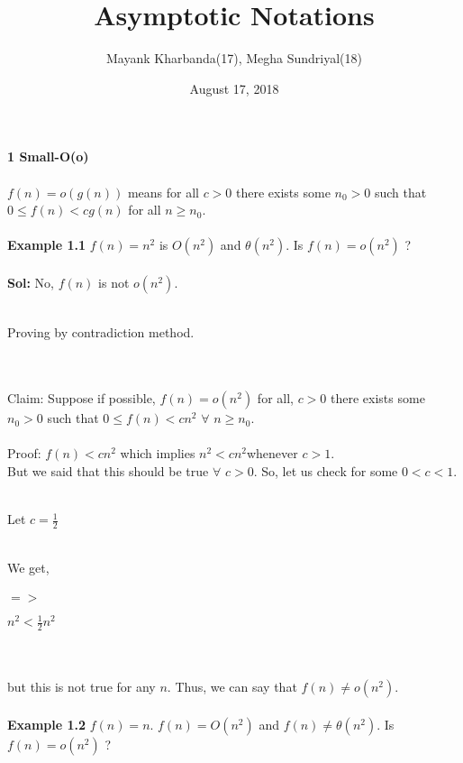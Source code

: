 \documentclass[a4paper, 12pt]{article}
\begin{document}
	\title{Asymptotic Notations}
	\author{Mayank Kharbanda(17), Megha Sundriyal(18)}
	\date{August 17, 2018}

	\maketitle
\paragraph{}
	\textbf{1 Small-O(o)}
\paragraph{}
	$f(n) = o(g(n))$ means for all $c > 0$ there exists some $n_{0} > 0$ such that $0\leq f(n)<cg(n)$ for all $n \geq n_{0}$.
\paragraph{}
	\textbf{Example 1.1} $f(n) = n^{2}$ is $O(n^{2})$ and $\theta(n^{2})$. Is $f(n) =  o(n^{2})$ ?
\paragraph{}
    \textbf{Sol:} No, $f(n)$ is not $o(n^{2})$.
	\\ \\ \centerline{Proving by contradiction method.}
	\\ \\Claim: Suppose if possible, $f(n) = o(n^{2})$ for all, $c > 0 $ there exists some $n_{0} > 0$ such that $0\leq f(n) < cn^{2}$ $\forall$ $n \geq n_{0}$.
	\\ \\Proof:
    	$f(n) <cn^{2}$ which implies $n^{2} < cn^{2}$whenever $c > 1$.
	\\But we said that this should be true $\forall$ $c > 0$. So, let us check for some $0 < c < 1$. 
	\\ \\ \centerline{Let $c = \frac{1}{2}$} 
	\\We get,
	\\ \\ $=>$ \centerline{$n^{2} < \frac{1}{2} n^{2}$}
	\\ \\but this is not true for any $n$. Thus, we can say that $f(n) \neq o(n^{2})$.
\paragraph{}
	\textbf{Example 1.2} $f(n) = n$. $f(n) = O(n^{2})$ and $f(n) \neq \theta(n^{2})$. Is $f(n) = o(n^{2})$ ?
\end{document}
